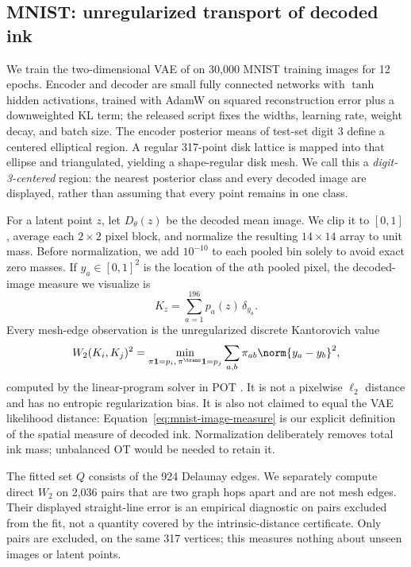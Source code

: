 \subsection{MNIST: unregularized transport of decoded ink}
\label{sec:mnist-experiment}

We train the two-dimensional VAE of \cite{kingma2014} on 30,000 MNIST
training images \cite{lecun1998} for 12 epochs.  Encoder and decoder are small
fully connected networks with $\tanh$ hidden activations, trained with AdamW
on squared reconstruction error plus a downweighted KL term; the released
script fixes the widths, learning rate, weight decay, and batch size.  The
encoder posterior means of test-set digit 3 define a centered elliptical
region.  A regular 317-point disk lattice is mapped into that
ellipse and triangulated, yielding a shape-regular disk mesh.  We call this a
\emph{digit-3-centered} region: the nearest posterior class and every decoded
image are displayed, rather than assuming that every point remains in one
class.

For a latent point $z$, let $D_\theta(z)$ be the decoded mean image.  We clip
it to $[0,1]$, average each $2\times2$ pixel block, and normalize the resulting
$14\times14$ array to unit mass.  Before normalization, we add $10^{-10}$ to
each pooled bin solely to avoid exact zero masses.  If $y_a\in[0,1]^2$ is the location of the
$a$th pooled pixel, the decoded-image measure we visualize is
\begin{equation}
 K_z=\sum_{a=1}^{196}p_a(z)\,\delta_{y_a}.
 \label{eq:mnist-image-measure}
\end{equation}
Every mesh-edge observation is the unregularized discrete Kantorovich value
\begin{equation}
 W_2(K_i,K_j)^2
 =\min_{\pi\mathbf1=p_i,\,\pi^{\trans}\mathbf1=p_j}
 \sum_{a,b}\pi_{ab}\norm{y_a-y_b}^2,
 \label{eq:mnist-discrete-ot}
\end{equation}
computed by the linear-program solver in POT \cite{flamary2021}.
It is not a pixelwise $\ell_2$ distance and has no entropic regularization
bias.  It is also not claimed to equal the VAE likelihood distance:
Equation~\eqref{eq:mnist-image-measure} is our explicit definition of the spatial measure of
decoded ink.  Normalization deliberately removes total ink mass; unbalanced
OT would be needed to retain it.

The fitted set $Q$ consists of the 924 Delaunay edges.  We separately compute
direct $W_2$ on 2,036 pairs that are two graph hops apart and are not mesh
edges.  Their displayed straight-line error is an empirical diagnostic on
pairs excluded from the fit, not a quantity covered by the intrinsic-distance
certificate.  Only pairs are excluded, on the same 317 vertices; this measures
nothing about unseen images or latent points.

